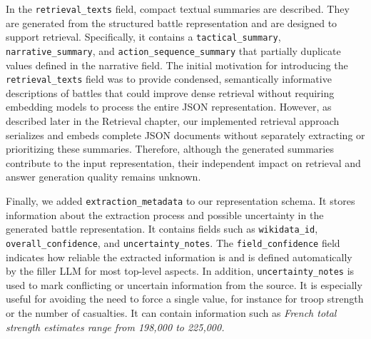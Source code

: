 In the \texttt{retrieval\_texts} field, compact textual summaries are described. They are generated from the structured battle representation and are designed to support retrieval. Specifically, it contains a \texttt{tactical\_summary}, \texttt{narrative\_summary}, and \texttt{action\_sequence\_summary} that partially duplicate values defined in the narrative field. The initial motivation for introducing the \texttt{retrieval\_texts} field was to provide condensed, semantically informative descriptions of battles that could improve dense retrieval without requiring embedding models to process the entire JSON representation. However, as described later in the Retrieval chapter, our implemented retrieval approach serializes and embeds complete JSON documents without separately extracting or prioritizing these summaries. Therefore, although the generated summaries contribute to the input representation, their independent impact on retrieval and answer generation quality remains unknown.

Finally, we added \texttt{extraction\_metadata} to our representation schema. It stores information about the extraction process and possible uncertainty in the generated battle representation. It contains fields such as \texttt{wikidata\_id}, \texttt{overall\_confidence}, and \texttt{uncertainty\_notes}. The \texttt{field\_confidence} field indicates how reliable the extracted information is and is defined automatically by the filler LLM for most top-level aspects. In addition, \texttt{uncertainty\_notes} is used to mark conflicting or uncertain information from the source. It is especially useful for avoiding the need to force a single value, for instance for troop strength or the number of casualties. It can contain information such as \textit{French total strength estimates range from 198,000 to 225,000.}

